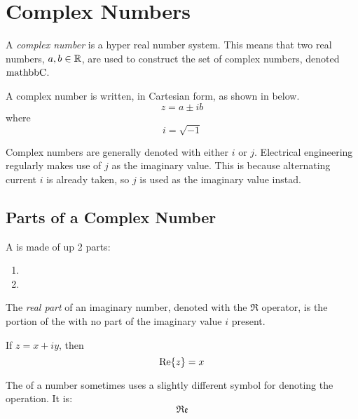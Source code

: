 \section{Complex Numbers}\label{sec:Complex_Numbers}
\begin{definition}\label{def:Complex_Number}
  A \emph{complex number} is a hyper real number system.
  This means that two real numbers, $a, b \in \operatorname{\mathbb{R}}$, are used to construct the set of complex numbers, denoted $\operatorname{mathbb{C}}$.

  A complex number is written, in Cartesian form, as shown in  below.
  \begin{equation}\label{eq:Complex_Number}
    z = a \pm ib
  \end{equation}
  where
  \begin{equation}\label{eq:Imaginary_Value}
    i = \sqrt{-1}
  \end{equation}

  \begin{remark*}
    Complex numbers are generally denoted with either $i$ or $j$.
    Electrical engineering regularly makes use of $j$ as the imaginary value.
    This is because alternating current $i$ is already taken, so $j$ is used as the imaginary value instad.
  \end{remark*}
\end{definition}

\subsection{Parts of a Complex Number}\label{subsec:Complex_Number_Parts}
A  is made of up 2 parts:
\begin{enumerate}[noitemsep]
\item {}
\item {}
\end{enumerate}

\begin{definition}\label{def:Real_Part}
  The \emph{real part} of an imaginary number, denoted with the $\Re$ operator, is the portion of the  with no part of the imaginary value $i$ present.

  If $z = x + iy$, then
  \begin{equation}\label{eq:Real_Part}
    \operatorname{Re} \lbrace z \rbrace = x
  \end{equation}

  \begin{remark}\label{rmk:Real_Part_Alternative_Notation}
    The  of a number sometimes uses a slightly different symbol for denoting the operation.
    It is:
    \begin{equation*}
      \mathfrak{Re}
    \end{equation*}
  \end{remark}
\end{definition}

